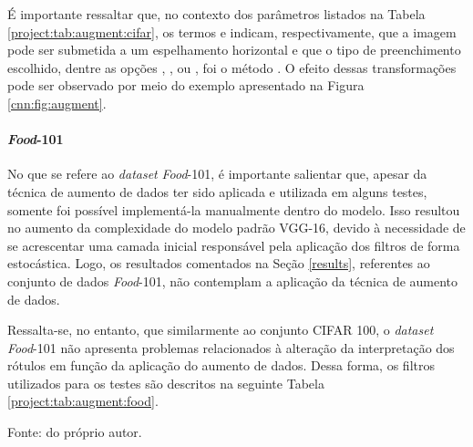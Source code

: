 É importante ressaltar que, no contexto dos parâmetros listados na Tabela \ref{project:tab:augment:cifar}, os termos  e  indicam, respectivamente, que a imagem pode ser submetida a um espelhamento horizontal e que o tipo de preenchimento escolhido, dentre as opções , ,  ou , foi o método . O efeito dessas transformações pode ser observado por meio do exemplo apresentado na Figura \ref{cnn:fig:augment}.

\paragraph{\textit{Food}-101}
\label{project:augment:food}
No que se refere ao \textit{dataset} \textit{Food}-101, é importante salientar que, apesar da técnica de aumento de dados ter sido aplicada e utilizada em alguns testes, somente foi possível implementá-la manualmente dentro do modelo. Isso resultou no aumento da complexidade do modelo padrão VGG-16, devido à necessidade de se acrescentar uma camada inicial responsável pela aplicação dos filtros de forma estocástica. Logo, os resultados comentados na Seção \ref{results}, referentes ao conjunto de dados \textit{Food}-101, não contemplam a aplicação da técnica de aumento de dados.

Ressalta-se, no entanto, que similarmente ao conjunto CIFAR 100, o \textit{dataset} \textit{Food}-101 não apresenta problemas relacionados à alteração da interpretação dos rótulos em função da aplicação do aumento de dados. Dessa forma, os filtros utilizados para os testes são descritos na seguinte Tabela \ref{project:tab:augment:food}.

\begin{table}[H]
    \centering
    \caption{Transformações geométricas aplicadas no conjunto de dados \textit{Food}-101.}
    \label{project:tab:augment:food}

    \vspace*{1 cm}
    Fonte: do próprio autor.
\end{table}

